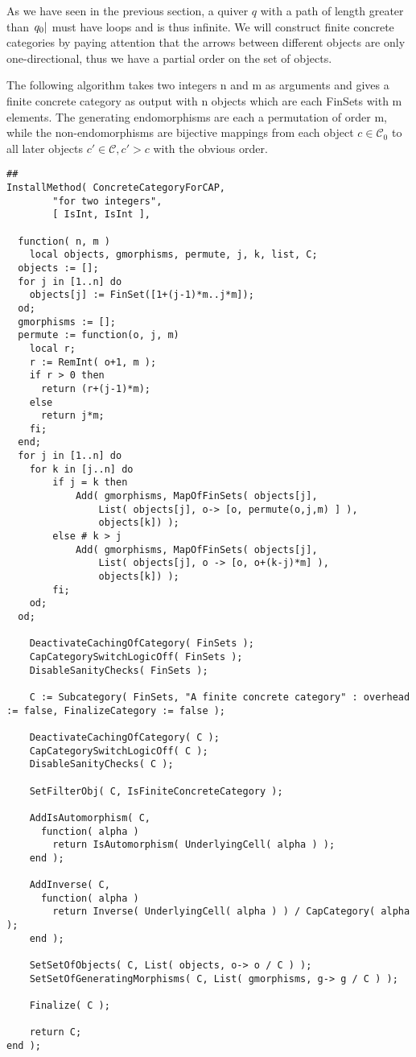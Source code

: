 As we have seen in the previous section, a quiver $q$ with a path of length greater than $\abs{q_{0}}$ must have loops and is thus infinite.
We will construct finite concrete categories by paying attention that the arrows between different objects are only one-directional, thus we
have a partial order on the set of objects.

The following algorithm takes two integers n and m as arguments and gives a finite concrete category as output with n objects which are each
FinSets with m elements. The generating endomorphisms are each a permutation of order m, while the non-endomorphisms are bijective
mappings from each object $c \in \mathcal{C}_{0}$ to all later objects $c' \in \mathcal{C}, c' > c$ with the obvious order.

\begin{verbatim}
##
InstallMethod( ConcreteCategoryForCAP,
        "for two integers",
        [ IsInt, IsInt ],
        
  function( n, m )
	local objects, gmorphisms, permute, j, k, list, C;
  objects := [];
  for j in [1..n] do
    objects[j] := FinSet([1+(j-1)*m..j*m]);
  od;
  gmorphisms := [];
  permute := function(o, j, m)
    local r;
    r := RemInt( o+1, m );
    if r > 0 then
      return (r+(j-1)*m);
    else
      return j*m;
    fi;
  end;
  for j in [1..n] do
    for k in [j..n] do
		if j = k then
		    Add( gmorphisms, MapOfFinSets( objects[j], 
				List( objects[j], o-> [o, permute(o,j,m) ] ),
				objects[k]) );
		else # k > j
			Add( gmorphisms, MapOfFinSets( objects[j],
				List( objects[j], o -> [o, o+(k-j)*m] ),
				objects[k]) );
		fi;
	od;
  od;
  
    DeactivateCachingOfCategory( FinSets );
    CapCategorySwitchLogicOff( FinSets );
    DisableSanityChecks( FinSets );
    
    C := Subcategory( FinSets, "A finite concrete category" : overhead := false, FinalizeCategory := false );
	
	DeactivateCachingOfCategory( C );
    CapCategorySwitchLogicOff( C );
    DisableSanityChecks( C );
	
	SetFilterObj( C, IsFiniteConcreteCategory );
	
	AddIsAutomorphism( C,
      function( alpha )
        return IsAutomorphism( UnderlyingCell( alpha ) );
    end );
	
	AddInverse( C,
      function( alpha )
        return Inverse( UnderlyingCell( alpha ) ) / CapCategory( alpha );
    end );
	
	SetSetOfObjects( C, List( objects, o-> o / C ) );
	SetSetOfGeneratingMorphisms( C, List( gmorphisms, g-> g / C ) );
	
    Finalize( C );
    
    return C;
end );
\end{verbatim}